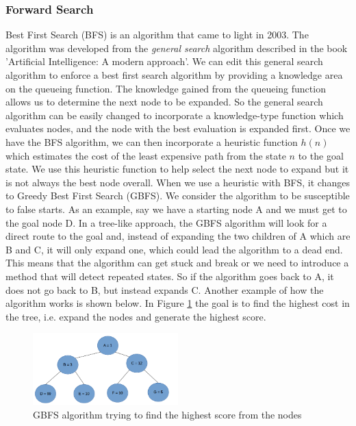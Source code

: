 \subsubsection{Forward Search}
Best First Search (BFS) is an algorithm that came to light in 2003. The algorithm was developed from the \textit{general search} algorithm described in the book 'Artificial Intelligence: A modern approach'. We can edit this general search algorithm to enforce a best first search algorithm by providing a knowledge area on the queueing function\cite{AModernApproach}. The knowledge gained from the queueing function allows us to determine the next node to be expanded. So the general search algorithm can be easily changed to incorporate a knowledge-type function which evaluates nodes, and the node with the best evaluation is expanded first. 
Once we have the BFS algorithm, we can then incorporate a heuristic function $h(n)$ which estimates the cost of the least expensive path from the state $n$ to the goal state. We use this heuristic function to help select the next node to expand but it is not always the best node overall. When we use a heuristic with BFS, it changes to Greedy Best First Search (GBFS). We consider the algorithm to be susceptible to false starts\cite{StochasticHillClimb}. As an example, say we have a starting node A and we must get to the goal node D. In a tree-like approach, the GBFS algorithm will look for a direct route to the goal and, instead of expanding the two children of A which are B and C, it will only expand one, which could lead the algorithm to a dead end. This means that the algorithm can get stuck and break or we need to introduce a method that will detect repeated states. So if the algorithm goes back to A, it does not go back to B, but instead expands C. 
Another example of how the algorithm works is shown below. In Figure \ref{fig:GBFSTree} the goal is to find the highest cost in the tree, i.e. expand the nodes and generate the highest score.
\\ 
\begin{figure}[!htb]
    \centering
    \includegraphics[scale=1.5,width=0.50\textwidth]{GBFSTree.png}
    \caption{GBFS algorithm trying to find the highest score from the nodes}
    \label{fig:GBFSTree}
\end{figure}
